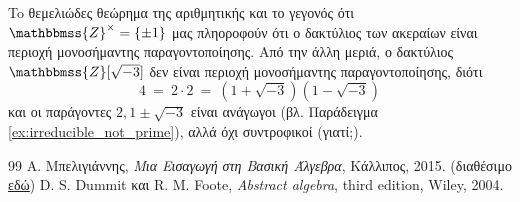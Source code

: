 \documentclass[12pt,a4paper,reqno]{amsart}
\theoremstyle{definition}
\theoremstyle{remark}
\numberwithin{theorem}{section}
\numberwithin{exercise}{section}
\numberwithin{equation}{section}
\newcommand{\ZZ}{\mathbbmss{Z}}
\begin{document}
To θεμελιώδες θεώρημα της αριθμητικής και το γεγονός ότι $\ZZ^\times = \{\pm1\}$ μας πληοροφούν ότι ο δακτύλιος των ακεραίων είναι περιοχή μονοσήμαντης παραγοντοποίησης. Από την άλλη μεριά, ο δακτύλιος $\ZZ[\sqrt{-3}]$ δεν είναι περιοχή μονοσήμαντης παραγοντοποίησης, διότι 
\[
    4 \ = \ 2 \cdot 2 \ = \ (1 + \sqrt{-3})(1 - \sqrt{-3})
\]
και οι παράγοντες $2, 1 \pm \sqrt{-3}$ είναι ανάγωγοι (βλ. Παράδειγμα \ref{ex:irreducible_not_prime}), αλλά όχι συντροφικοί (γιατί;).


\begin{thebibliography}{99}
    Α. Μπελιγιάννης, 
    \textit{Μια Εισαγωγή στη Βασική Άλγεβρα},
    Κάλλιπος, 2015. (διαθέσιμο \href{https://dx.doi.org/10.57713/kallipos-547}{εδώ})
    D. S. Dummit και R. M. Foote, 
    \textit{Abstract algebra},
    third edition, Wiley, 2004. 
\end{thebibliography}
\end{document}
